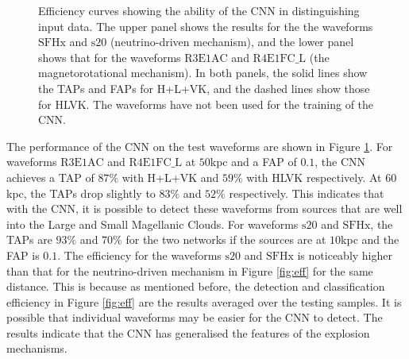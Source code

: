 \documentclass[aps,twocolumn,showpacs,groupedaddress, nofootinbib]{revtex4}  %
\begin{document}
\begin{figure}
     \begin{center}
%
        \quad
%
    \end{center}
    \caption{Efficiency curves showing the ability of the \ac{CNN} in distinguishing input data.
    The upper panel shows the results for the the waveforms $\text{SFHx}$ and $\text{s}20$ (neutrino-driven mechanism), 
    and the lower panel shows that for the waveforms $\text{R3E1AC}$ and $\text{R4E1FC\_L}$ (the magnetorotational mechanism).
    In both panels, the solid lines show the \acp{TAP} and \acp{FAP} for H+L+VK, and the dashed lines show those for HLVK.  
    The waveforms have not been used for the training of the \ac{CNN}.
\label{fig:Extratest}}%
\end{figure}
The performance of the \ac{CNN} on the test waveforms are shown in Figure \ref{fig:Extratest}.
For waveforms $\text{R3E1AC}$ and $\text{R4E1FC\_L}$ at $50$kpc and a \ac{FAP} of $0.1$, the \ac{CNN} achieves a \ac{TAP} of $87\%$ with H+L+VK and $59\%$ with HLVK respectively.
At $60$kpc, the \acp{TAP} drop slightly to $83\%$ and $52\%$ respectively.
This indicates that with the \ac{CNN}, it is possible to detect these waveforms from sources that are well into the Large and Small Magellanic Clouds.
For waveforms $\text{s}20$ and $\text{SFHx}$, the \acp{TAP} are $93\%$ and $70\%$ for the two networks if the sources are at $10$kpc and the \ac{FAP} is $0.1$. 
The efficiency for the waveforms $\text{s}20$ and $\text{SFHx}$ is noticeably higher than that for the neutrino-driven mechanism in Figure \ref{fig:eff} for the same distance.
This is because as mentioned before, the detection and classification efficiency in Figure \ref{fig:eff} are the results averaged over the testing samples.
It is possible that individual waveforms may be easier for the \ac{CNN} to detect. The results indicate that the \ac{CNN} has generalised the features of the explosion mechanisms.
\end{document}

